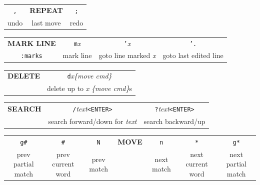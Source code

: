 \documentclass[12pt]{article}
\begin{document}
\begin{center}
  \begin{tabular}{ccc}
   \texttt{,} & \large{\textbf{REPEAT}} & \texttt{;} \\
   undo & last move & redo \\
  \end{tabular}
\end{center}

\begin{center}
  \begin{tabular}{cccc}
    \large{\textbf{MARK LINE}} & \texttt{m}\textit{x} & \texttt{'}\textit{x} & \texttt{'.} \\
    \texttt{:marks} & mark line & goto line marked \textit{x} & goto last edited line \\
  \end{tabular}
\end{center}

\begin{center}
  \begin{tabular}{cc}
    \large{\textbf{DELETE}} & \texttt{d}\textit{x}\textit{\{move cmd\}}\\
    & delete up to \textit{x} \textit{\{move cmd\}}s
  \end{tabular}
\end{center}

\begin{center}
  \begin{tabular}{ccc}
    \large{\textbf{SEARCH}} & \texttt{/}\textit{text}\texttt{<ENTER>} & \texttt{?}\textit{text}\texttt{<ENTER>}\\
    & search forward/down for \textit{text} & search backward/up
  \end{tabular}
\end{center}
  
\begin{center}
  \begin{tabular}{ccccccc}
   \texttt{g#} & \texttt{#}& \texttt{N}& \large{\textbf{MOVE}} & \texttt{n}& \texttt{*}& \texttt{g*}\\
   prev partial match & prev current word & prev match &  & next match & next current word & next partial match \\
  \end{tabular}
\end{center}
\end{document}

